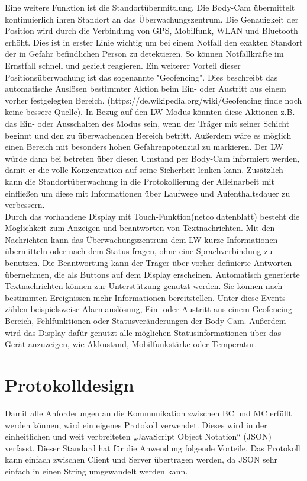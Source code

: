 \documentclass[thesis.tex]{subfiles}
\begin{document}
Eine weitere Funktion ist die Standortübermittlung.
Die Body-Cam übermittelt kontinuierlich ihren Standort an das Überwachungszentrum.
Die Genauigkeit der Position wird durch die Verbindung von GPS, Mobilfunk, WLAN und Bluetooth erhöht.
Dies ist in erster Linie wichtig um bei einem Notfall den exakten Standort der in Gefahr befindlichen Person zu detektieren.
So können Notfallkräfte im Ernstfall schnell und gezielt reagieren.
Ein weiterer Vorteil dieser Positionsüberwachung ist das sogenannte "Geofencing".
Dies beschreibt das automatische Auslösen bestimmter Aktion beim Ein- oder Austritt aus einem vorher festgelegten Bereich.
(https://de.wikipedia.org/wiki/Geofencing finde noch keine bessere Quelle).
In Bezug auf den LW-Modus könnten diese Aktionen z.B. das Ein- oder Ausschalten des Modus sein, wenn der Träger mit seiner Schicht beginnt und den zu überwachenden Bereich betritt.
Außerdem wäre es möglich einen Bereich mit besonders hohen Gefahrenpotenzial zu markieren.
Der LW würde dann bei betreten über diesen Umstand per Body-Cam informiert werden, damit er die volle Konzentration auf seine Sicherheit lenken kann.
Zusätzlich kann die Standortüberwachung in die Protokollierung der Alleinarbeit mit einfließen um diese mit Informationen über Laufwege und Aufenthaltsdauer zu verbessern.
\\

Durch das vorhandene Display mit Touch-Funktion(netco datenblatt) besteht die Möglichkeit zum Anzeigen und beantworten von Textnachrichten.
Mit den Nachrichten kann das Überwachungszentrum dem LW kurze Informationen übermitteln oder nach dem Status fragen, ohne eine Sprachverbindung zu benutzen.
Die Beantwortung kann der Träger über vorher definierte Antworten übernehmen, die als Buttons auf dem Display erscheinen.
Automatisch generierte Textnachrichten können zur Unterstützung genutzt werden.
Sie können nach bestimmten Ereignissen mehr Informationen bereitstellen.
Unter diese Events zählen beispielsweise Alarmauslösung, Ein- oder Austritt aus einem Geofencing-Bereich, Fehlfunktionen oder Statusveränderungen der Body-Cam.
Außerdem wird das Display dafür genutzt alle möglichen Statusinformationen über das Gerät anzuzeigen, wie Akkustand, Mobilfunkstärke oder Temperatur.
\\

\section{Protokolldesign}
Damit alle Anforderungen an die Kommunikation zwischen BC und MC erfüllt werden können, wird ein eigenes Protokoll verwendet.
Dieses wird in der einheitlichen und weit verbreiteten „JavaScript Object Notation“ (JSON) verfasst.
Dieser Standard hat für die Anwendung folgende Vorteile.
Das Protokoll kann einfach zwischen Client und Server übertragen werden, da JSON sehr einfach in einen String umgewandelt werden kann.
\\
\end{document}
